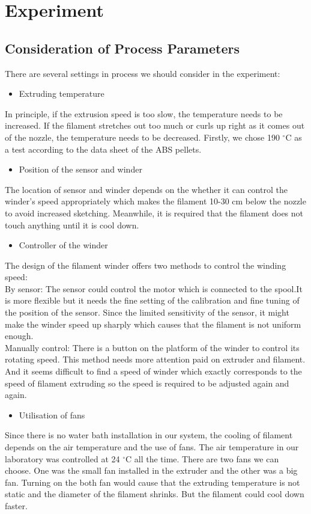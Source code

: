 \section{Experiment}
\subsection{Consideration of Process Parameters}
There are several settings in process we should consider in the experiment:
\begin{itemize}
\item Extruding temperature
\end{itemize}
In principle, if the extrusion speed is too slow, the temperature needs to be increased. If the filament stretches out too much or curls up right as it comes out of the nozzle, the temperature needs to be decreased. Firstly, we chose 190 $^{\circ}$C as a test according to the data sheet of the ABS pellets.
\begin{itemize}
\item Position of the sensor and winder
\end{itemize}
The location of sensor and winder depends on the whether it can control the winder’s speed appropriately which makes the filament 10-30 cm below the nozzle to avoid increased sketching. Meanwhile, it is required that the filament does not touch anything until it is cool down.
\begin{itemize}
\item Controller of the winder
\end{itemize}
The design of the filament winder offers two methods to control the winding speed:
\\
By sensor: The sensor could control the motor which is connected to the spool.It is more flexible but it needs the fine setting of the calibration and fine tuning of the position of the sensor. Since the limited sensitivity of the sensor, it might make the winder speed up sharply which causes that the filament is not uniform enough.
\\
Manually control: There is a button on the platform of the winder to control its rotating speed. This method needs more attention paid on extruder and filament. And it seems difficult to find a speed of winder which exactly corresponds to the speed of filament extruding so the speed is required to be adjusted again and again.
\begin{itemize}
\item Utilisation of fans
\end{itemize}
Since there is no water bath installation in our system, the cooling of filament depends on the air temperature and the use of fans. The air temperature in our laboratory was controlled at 24 $^{\circ}$C all the time. There are two fans we can choose. One was the small fan installed in the extruder and the other was a big fan.
Turning on the both fan would cause that the extruding temperature is not static and the diameter of the filament shrinks. But the filament could cool down faster.

